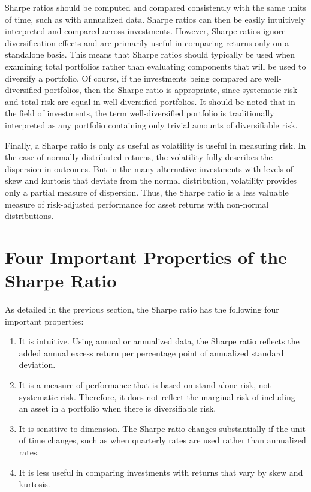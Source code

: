 \documentclass[11pt]{article}
\begin{document}
Sharpe ratios should be computed and compared consistently with the same units of time, such as with annualized data. Sharpe ratios can then be easily intuitively interpreted and compared across investments. However, Sharpe ratios ignore diversification effects and are primarily useful in comparing returns only on a standalone basis. This means that Sharpe ratios should typically be used when examining total portfolios rather than evaluating components that will be used to diversify a portfolio. Of course, if the investments being compared are well-diversified portfolios, then the Sharpe ratio is appropriate, since systematic risk and total risk are equal in well-diversified portfolios. It should be noted that in the field of investments, the term well-diversified portfolio is traditionally interpreted as any portfolio containing only trivial amounts of diversifiable risk.

Finally, a Sharpe ratio is only as useful as volatility is useful in measuring risk. In the case of normally distributed returns, the volatility fully describes the dispersion in outcomes. But in the many alternative investments with levels of skew and kurtosis that deviate from the normal distribution, volatility provides only a partial measure of dispersion. Thus, the Sharpe ratio is a less valuable measure of risk-adjusted performance for asset returns with non-normal distributions.

\section*{Four Important Properties of the Sharpe Ratio}
As detailed in the previous section, the Sharpe ratio has the following four important properties:

\begin{enumerate}
  \item It is intuitive. Using annual or annualized data, the Sharpe ratio reflects the added annual excess return per percentage point of annualized standard deviation.

  \item It is a measure of performance that is based on stand-alone risk, not systematic risk. Therefore, it does not reflect the marginal risk of including an asset in a portfolio when there is diversifiable risk.

  \item It is sensitive to dimension. The Sharpe ratio changes substantially if the unit of time changes, such as when quarterly rates are used rather than annualized rates.

  \item It is less useful in comparing investments with returns that vary by skew and kurtosis.

\end{enumerate}
\end{document}
